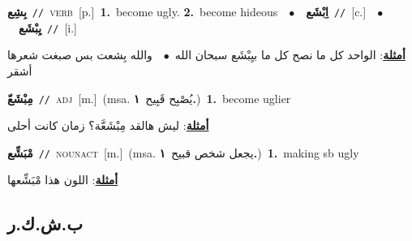 \documentclass[10pt,a4paper,twoside]{article} %
\begin{document}
\begin{multicols}{2}
{\setlength\topsep{0pt}\textbf{\foreignlanguage{arabic}{بِشِع}}\ {\color{gray}\texttt{//}\color{black}}\ \textsc{verb}\ [p.]\ \textbf{1.}~become ugly.  \textbf{2.}~become hideous\ \ $\bullet$\ \ \setlength\topsep{0pt}\textbf{\foreignlanguage{arabic}{اِبْشَع}}\ {\color{gray}\texttt{//}\color{black}}\ [c.]\ \ $\bullet$\ \ \setlength\topsep{0pt}\textbf{\foreignlanguage{arabic}{يِبْشَع}}\ {\color{gray}\texttt{//}\color{black}}\ [i.]\  \begin{flushright}\color{gray}\foreignlanguage{arabic}{\textbf{\underline{\foreignlanguage{arabic}{أمثلة}}}: الواحد كل ما نصح كل ما بيِبْشَع سبحان الله\ $\bullet$\ \  والله بِشعت بس صبغت شعرها أشقر}\end{flushright}\color{black}} \vspace{2mm}

{\setlength\topsep{0pt}\textbf{\foreignlanguage{arabic}{مِبْشَعّ}}\ {\color{gray}\texttt{//}\color{black}}\ \textsc{adj}\ [m.]\ \color{gray}(msa. \foreignlanguage{arabic}{يُصْبِح قَبِيح}~\foreignlanguage{arabic}{\textbf{١.}})\color{black}\ \textbf{1.}~become uglier\  \begin{flushright}\color{gray}\foreignlanguage{arabic}{\textbf{\underline{\foreignlanguage{arabic}{أمثلة}}}: ليش هالقد مِبْشَعَّة؟ زمان كانت أحلى}\end{flushright}\color{black}} \vspace{2mm}

{\setlength\topsep{0pt}\textbf{\foreignlanguage{arabic}{مْبَشِّع}}\ {\color{gray}\texttt{//}\color{black}}\ \textsc{noun\textunderscore act}\ [m.]\ \color{gray}(msa. \foreignlanguage{arabic}{يجعل شخص قبيح}~\foreignlanguage{arabic}{\textbf{١.}})\color{black}\ \textbf{1.}~making sb ugly\  \begin{flushright}\color{gray}\foreignlanguage{arabic}{\textbf{\underline{\foreignlanguage{arabic}{أمثلة}}}: اللون هذا مْبَشِّعها}\end{flushright}\color{black}} \vspace{2mm}

\vspace{-3mm}
\subsection*{\color{blue}\foreignlanguage{arabic}{ب.ش.ك.ر}\color{blue}{}} 


\end{multicols}
\end{document}
